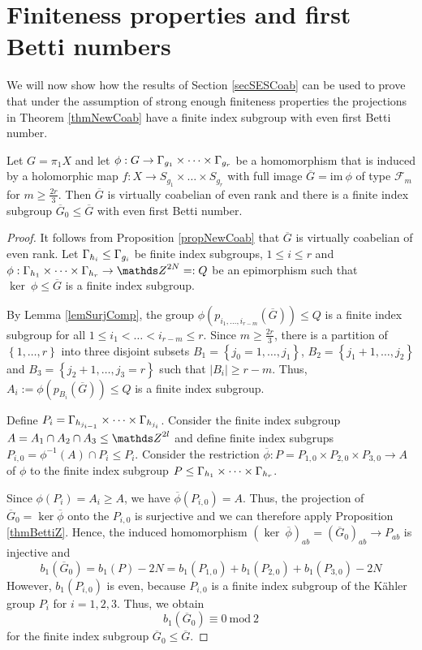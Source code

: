 \section{Finiteness properties and first Betti numbers}
\label{secFinPropBetti}

We will now show how the results of Section \ref{secSESCoab} can be used to prove that under the assumption of strong enough finiteness properties the projections in Theorem \ref{thmNewCoab} have a finite index subgroup with even first Betti number.
 
\begin{proposition}
\label{propVB1}
 Let $G=\pi_1 X$ and let $\phi: G\rightarrow \Gamma_{g_1}\times \dots \times \Gamma_{g_r}$ be a homomorphism that is induced by a holomorphic map $f: X\rightarrow S_{g_1}\times \dots \times S_{g_r}$ with full image $\overline{G}=\mathrm{im}~ \phi$ of type $\mathcal{F}_m$ for $m\geq \frac{2r}{3}$. Then $\overline{G}$ is virtually coabelian of even rank and there is a finite index subgroup $\overline{G}_0\leq \overline{G}$ with even first Betti number.
\end{proposition}
\begin{proof}
It follows from Proposition \ref{propNewCoab} that $\overline{G}$ is virtually coabelian of even rank. Let $\Gamma_{h_i}\leq \Gamma_{g_i}$ be finite index subgroups, $1\leq i \leq r$ and $\phi: \G_{h_1}\times \dots \times \G_{h_r}\rightarrow \ZZ^{2N}=:Q$ be an epimorphism such that $\ker ~ \phi \leq \overline{G}$ is a finite index subgroup. 

By Lemma \ref{lemSurjComp}, the group $\phi\left(p_{i_1,\dots, i_{r-m}}(\overline{G})\right)  \leq Q$ is a finite index subgroup for all $1\leq i_1 < \dots < i_{r-m}\leq r$. Since $m\geq \frac{2r}{3}$, there is a partition of $\left\{1,\dots, r\right\}$ into three disjoint subsets $B_1=\left\{j_0=1,\dots, j_1\right\}$, $B_2=\left\{j_1+1,\dots, j_2\right\}$ and $B_3= \left\{j_2+1,\dots, j_3=r\right\}$ such that $|B_i|\geq r-m$. Thus, $A_i:= \phi\left(p_{B_i}(\overline{G})\right)\leq Q$ is a finite index subgroup. 

Define $P_i = \Gamma_{h_{j_{i-1}}}\times \dots \times \Gamma_{h_{j_i}}$. Consider the finite index subgroup $A=A_1\cap A_2 \cap A_3\leq \ZZ^{2l}$ and define finite index subgrups $P_{i,0}=\phi^{-1}(A)\cap P_i \leq P_i$. Consider the restriction $\overline{\phi}: P=P_{1,0}\times P_{2,0}\times P_{3,0}\rightarrow A$ of $\phi$ to the finite index subgroup $P\leq \Gamma_{h_1}\times \dots \times \Gamma_{h_r}$. 

Since $\phi(P_i)=A_i\geq A$, we have $\overline{\phi}(P_{i,0})=A$. Thus, the projection of $\overline{G}_0 = \ker \overline{\phi}$ onto the $P_{i,0}$ is surjective and we can therefore apply Proposition \ref{thmBettiZ}. Hence, the induced homomorphism $\left(\ker ~ \overline{\phi}\right)_{ab}= (\overline{G}_0)_{ab}\rightarrow P_{ab}$ is injective and
\[
 b_1(\overline{G}_0) = b_1(P)- 2N= b_1(P_{1,0})+b_1(P_{2,0})+b_1(P_{3,0})-2N
\]
However, $b_1(P_{i,0})$ is even, because $P_{i,0}$ is a finite index subgroup of the K\"ahler group $P_i$ for $i=1,2,3$. Thus, we obtain
\[
b_1(\overline{G}_0)\equiv 0 ~ \mathrm{ mod } ~ 2
\]
for the finite index subgroup $\overline{G}_0\leq \overline{G}$.
\end{proof}

